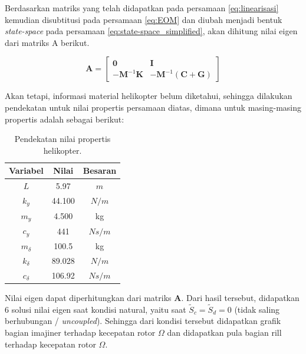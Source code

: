 Berdasarkan matriks yang telah didapatkan pada persamaan \ref{eq:linearisasi} kemudian disubtitusi pada persamaan \ref{eq:EOM} dan diubah menjadi bentuk \textit{state-space} pada persamaan \ref{eq:state-space_simplified}, akan dihitung nilai eigen dari matriks A berikut.

\begin{equation}
	\mathbf{A}=\begin{bmatrix}
	\mathbf{0}& \mathbf{I}\\
	\mathbf{-M}^{-1}\mathbf{K}& \mathbf{-M}^{-1}(\mathbf{C}+\mathbf{G})
	\end{bmatrix}
\end{equation}

Akan tetapi, informasi material helikopter belum diketahui, sehingga dilakukan pendekatan untuk nilai propertis persamaan diatas, dimana untuk masing-masing propertis adalah sebagai berikut:

\begin{table}[h]
	\centering
	\caption{Pendekatan nilai propertis helikopter.}
	\label{tb:propertis}
	\begin{tabular}{|c|c|c|}
		\hline
		Variabel     & Nilai  	& Besaran \\ \hline
		$L$          & 5.97  	& $m$     \\ \hline
		$k_y$        & 44.100  	& $N/m$   \\ \hline
		$m_y$        & 4.500   	& kg      \\ \hline
		$c_y$        & 441    	& $Ns/m$  \\ \hline
		$m_{\delta}$ & 100.5  	& kg      \\ \hline
		$k_{\delta}$ & 89.028  	& $N/m$   \\ \hline
		$c_{\delta}$ & 106.92 	& $Ns/m$  \\ \hline
	\end{tabular}
\end{table}

Nilai eigen dapat diperhitungkan dari matriks $\mathbf{A}$. Dari hasil tersebut, didapatkan 6 solusi nilai eigen saat kondisi natural, yaitu saat $\tilde{S}_c = \tilde{S}_d = 0$ (tidak saling berhubungan / \textit{uncoupled}). Sehingga dari kondisi tersebut didapatkan grafik bagian imajiner terhadap kecepatan rotor $\Omega$ dan didapatkan pula bagian rill terhadap kecepatan rotor $\Omega$.

